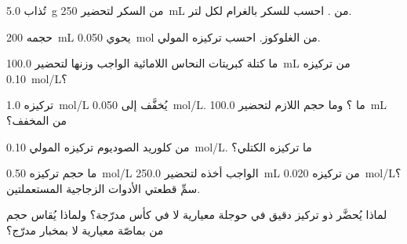 \begin{exercise}[$\star$]\label{exo:g10:concentration-and-dilution:1}
تُذاب \qty{5.0}{g} من السكر لتحضير \qty{250}{mL} من .
احسب  للسكر بالغرام لكل لتر.
\end{exercise}

\begin{exercise}[$\star$]\label{exo:g10:concentration-and-dilution:2}
 حجمه \qty{200}{mL} يحوي \qty{0.050}{mol} من الغلوكوز.
احسب تركيزه المولي.
\end{exercise}

\begin{exercise}[$\star$]\label{exo:g10:concentration-and-dilution:3}
ما كتلة كبريتات النحاس اللامائية  الواجب وزنها لتحضير
\qty{100.0}{mL} من  تركيزه \qty{0.10}{mol/L}؟
\end{exercise}

\begin{exercise}[$\star$]\label{exo:g10:concentration-and-dilution:4}
 تركيزه \qty{1.0}{mol/L} يُخفَّف إلى \qty{0.050}{mol/L}.
ما ؟ وما حجم  اللازم لتحضير
\qty{100.0}{mL} من  المخفف؟
\end{exercise}

\begin{exercise}[$\star$]\label{exo:g10:concentration-and-dilution:5}
 من كلوريد الصوديوم تركيزه المولي
\qty{0.10}{mol/L}. ما تركيزه الكتلي؟
\end{exercise}

\begin{exercise}[$\star\star$]\label{exo:g10:concentration-and-dilution:6}
ما حجم  تركيزه \qty{0.50}{mol/L} الواجب أخذه لتحضير
\qty{250.0}{mL} من  تركيزه \qty{0.020}{mol/L}؟ سمِّ قطعتي الأدوات
الزجاجية المستعملتين.
\end{exercise}

\begin{exercise}[$\star\star$]\label{exo:g10:concentration-and-dilution:7}
لماذا يُحضَّر  ذو تركيز دقيق في حوجلة معيارية لا في كأس مدرّجة؟ ولماذا
يُقاس حجم من  بماصّة معيارية لا بمخبار
مدرّج؟
\end{exercise}

